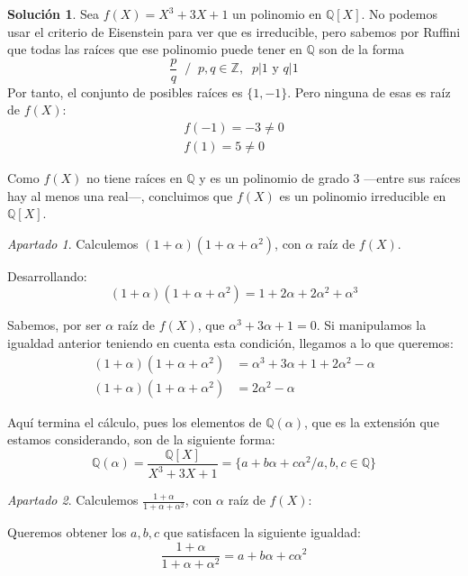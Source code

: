 \documentclass[a4paper, 11pt]{article}
\theoremstyle{definition}
\newtheorem*{solucion}{Solución}
\theoremstyle{remark}
\newtheorem{apartado}{Apartado}[ejercicio]
\begin{document}
  \begin{solucion}
      Sea $f(X) = X^3 + 3X + 1$ un polinomio en $\mathbb{Q}[X]$. No podemos usar el criterio de Eisenstein para ver que es irreducible, pero sabemos por Ruffini que todas las raíces que ese polinomio puede tener en $\mathbb{Q}$ son de la forma
      \[
      \frac{p}{q}\;\; / \;\; p,q\in\mathbb{Z},\;\; p|1 \textrm{ y } q|1
      \]Por tanto, el conjunto de posibles raíces es $\{1,-1\}$. Pero ninguna de esas es raíz de $f(X)$:
      \begin{align*}
          f(-1) = -3 \neq 0 \\
          f(1) = 5 \neq 0
      \end{align*}

      Como $f(X)$ no tiene raíces en $\mathbb{Q}$ y es un polinomio de grado 3 ---entre sus raíces hay al menos una real---, concluimos que $f(X)$ es un polinomio irreducible en $\mathbb{Q}[X]$.

      \begin{apartado}
          Calculemos $(1+\alpha)(1+\alpha+\alpha^2)$, con $\alpha$ raíz de $f(X)$.

          Desarrollando:
          \[
              (1+\alpha)(1+\alpha+\alpha^2) = 1 + 2\alpha + 2\alpha^2 + \alpha^3
          \]

          Sabemos, por ser $\alpha$ raíz de $f(X)$, que $\alpha^3 + 3\alpha + 1 = 0$. Si manipulamos la igualdad anterior teniendo en cuenta esta condición, llegamos a lo que queremos:
          \begin{align*}
              (1+\alpha)(1+\alpha+\alpha^2) &= \alpha^3 + 3\alpha + 1 + 2\alpha^2 - \alpha \\
              (1+\alpha)(1+\alpha+\alpha^2) &= 2\alpha^2 - \alpha
          \end{align*}

          Aquí termina el cálculo, pues los elementos de $\mathbb{Q}(\alpha)$, que es la extensión que estamos considerando, son de la siguiente forma:
          \[
          \mathbb{Q}(\alpha) = \frac{\mathbb{Q}[X]}{X^3+3X+1} = \{a + b\alpha + c\alpha^2 / a,b,c\in\mathbb{Q}\}
          \]
      \end{apartado}

      \begin{apartado}
          Calculemos $\frac{1+\alpha}{1+\alpha+\alpha^2}$, con $\alpha$ raíz de $f(X)$:

          Queremos obtener los $a,b,c$ que satisfacen la siguiente igualdad:
          \[
          \frac{1+\alpha}{1+\alpha+\alpha^2} = a + b\alpha + c\alpha^2
          \]


\end{apartado}
\end{solucion}
\end{document}
